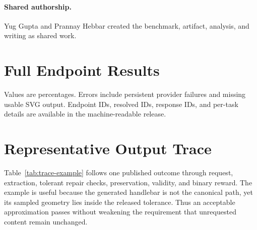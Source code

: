 \documentclass[11pt]{article}
\begin{document}
\paragraph{Shared authorship.}
Yug Gupta and Prannay Hebbar created the benchmark, artifact, analysis, and
writing as shared work.

\section{Full Endpoint Results}
\label{sec:full-results}

Values are percentages. Errors include persistent provider failures and missing
usable SVG output. Endpoint IDs, resolved IDs, response IDs, and per-task details
are available in the machine-readable release.

\scriptsize

\small
\clearpage

\section{Representative Output Trace}
\label{sec:trace-example}

Table~\ref{tab:trace-example} follows one published outcome through request,
extraction, tolerant repair checks, preservation, validity, and binary reward.
The example is useful because the generated handlebar is not the canonical path,
yet its sampled geometry lies inside the released tolerance. Thus an acceptable
approximation passes without weakening the requirement that unrequested content
remain unchanged.
\end{document}

